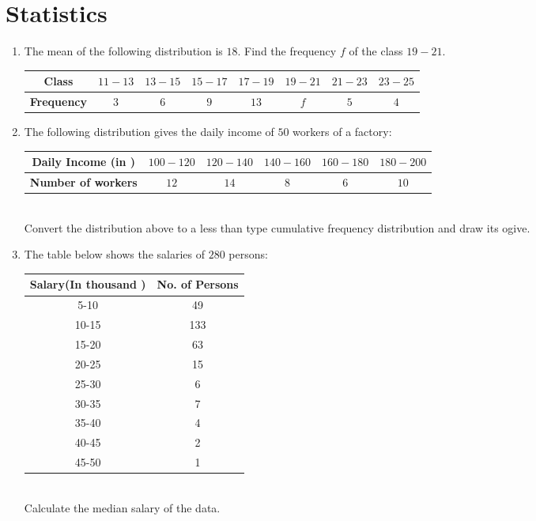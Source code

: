 \documentclass{article}
\begin{document}
	\section{Statistics}
	\begin{enumerate}[label=(\roman*)]
\item The mean of the following distribution is $18$. Find the frequency $f$ of the class $19-21$.\\

	\begin{tabular}{|c|c|c|c|c|c|c|c|}
\hline
	\textbf{Class} & $11-13$ & $13-15$ & $15-17$ & $17-19$ & $19-21$ & $21-23$ & $23-25$ \\
\hline
	\textbf{Frequency} & $3$ & $6$ & $9$ & $13$ & $f$ & $5$ & $4$ \\
\hline
\end{tabular}
\item The following distribution gives the daily income of $50$ workers of a factory:\\

	\begin{tabular}{|c|c|c|c|c|c|}
		\hline
		\textbf{Daily Income (in  \rupee )} & $100-120$ & $120-140$ & $140-160$ & $160-180$ & $180-200$\\
\hline
		\textbf{Number of workers} & $12$ & $14$ &$8$ & $6$ & $10$\\
		\hline
	\end{tabular}\\

	Convert the distribution above to a less than type cumulative frequency distribution and draw its ogive.
		\item The table below shows the salaries of $280$ persons:\\

			\begin{tabular}{|c|c|}
				\hline
				\textbf{Salary(In thousand  \rupee )} & \textbf{No. of Persons}\\
				\hline
				5-10 & 49 \\
				\hline
				10-15 & 133 \\ 
				\hline
				15-20 & 63 \\
				\hline
				20-25 & 15 \\
				\hline
				25-30 & 6 \\
				\hline
				30-35 & 7 \\
				\hline
				35-40 & 4 \\
				\hline
				40-45 & 2 \\
				\hline
				45-50 & 1 \\
				\hline
			\end{tabular}\\

			Calculate the median salary of the data.

	\end{enumerate}
\end{document}
